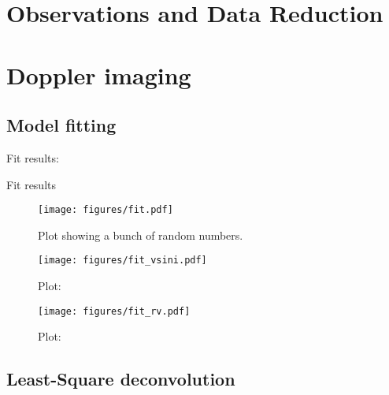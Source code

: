 \documentclass[twocolumn]{aastex631}
\begin{document}
\section{Observations and Data Reduction}

\section{Doppler imaging}

\subsection{Model fitting}

Fit results:
\begin{table*}[ht!]
    \centering
    \caption{Fit results}
    \label{tab:my_table}
\end{table*}


\begin{figure*}[ht!]
    \begin{centering}
        \texttt{[image: figures/fit.pdf]}
        \caption{
            Plot showing a bunch of random numbers.
        }
        \label{fig:fit}
    \end{centering}
\end{figure*}

\begin{figure*}[ht!]
    \begin{centering}
    \begin{minipage}[b]{0.48\textwidth}
        \centering
        \texttt{[image: figures/fit\_vsini.pdf]}
        \caption{Plot: }
        \label{fig:fit_vsini}
    \end{minipage}
    \hfill
    \begin{minipage}[b]{0.48\textwidth}
         \centering
         \texttt{[image: figures/fit\_rv.pdf]}
         \caption{Plot: }
         \label{fig:fit_rv}
    \end{minipage}
    \end{centering}
\end{figure*}


\subsection{Least-Square deconvolution}
\end{document}
